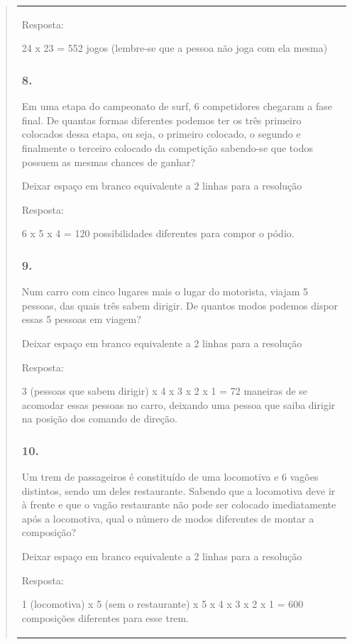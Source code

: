 \begin{enumerate}
\begin{escolha}
\begin{enumerate}
\begin{itemize}
\begin{itemize}
\begin{escolha}
\begin{quote}
\begin{escolha}
{\begin{longtable}[]{@{}l@{}}
\begin{itemize}
Resposta:

24 x 23 = 552 jogos (lembre-se que a pessoa não joga com ela mesma)

\subsubsection{8.}\label{section-137}

Em uma etapa do campeonato de surf, 6 competidores chegaram a fase
final. De quantas formas diferentes podemos ter os três primeiro
colocados dessa etapa, ou seja, o primeiro colocado, o segundo e
finalmente o terceiro colocado da competição sabendo-se que todos
possuem as mesmas chances de ganhar?

Deixar espaço em branco equivalente a 2 linhas para a resolução

Resposta:

6 x 5 x 4 = 120 possibilidades diferentes para compor o pódio.

\subsubsection{9.}\label{section-138}

Num carro com cinco lugares mais o lugar do motorista, viajam 5 pessoas,
das quais três sabem dirigir. De quantos modos podemos dispor essas 5
pessoas em viagem?

Deixar espaço em branco equivalente a 2 linhas para a resolução

Resposta:

3 (pessoas que sabem dirigir) x 4 x 3 x 2 x 1 = 72 maneiras de se
acomodar essas pessoas no carro, deixando uma pessoa que saiba dirigir
na posição dos comando de direção.

\subsubsection{10.}\label{section-139}

Um trem de passageiros é constituído de uma locomotiva e 6 vagões
distintos, sendo um deles restaurante. Sabendo que a locomotiva deve ir
à frente e que o vagão restaurante não pode ser colocado imediatamente
após a locomotiva, qual o número de modos diferentes de montar a
composição?

Deixar espaço em branco equivalente a 2 linhas para a resolução

Resposta:

1 (locomotiva) x 5 (sem o restaurante) x 5 x 4 x 3 x 2 x 1 = 600
composições diferentes para esse trem.


\end{itemize}
\end{longtable}}
\end{escolha}
\end{quote}
\end{escolha}
\end{itemize}
\end{itemize}
\end{enumerate}
\end{escolha}
\end{enumerate}
